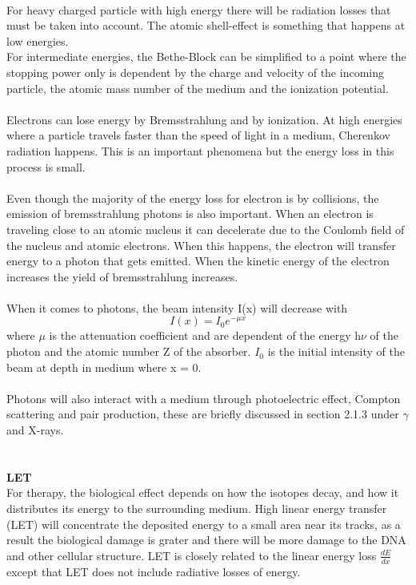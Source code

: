 \documentclass[twoside,english]{uiofysmaster/uiofysmaster}
\begin{document}
\\
For heavy charged particle with high energy there will be radiation losses that must be taken into account. The atomic shell-effect is something that happens at low energies.\cite{nuclearchem}\\
For intermediate energies, the Bethe-Block can be simplified to a point where the stopping power only is dependent by the charge and velocity of the incoming particle, the atomic mass number of the medium and the ionization potential\cite{nuclearchem}.\\
\\
Electrons can lose energy by Bremsstrahlung and by ionization. At high energies where a particle travels faster than the speed of light in a medium, Cherenkov radiation happens. This is an important phenomena but the energy loss in this process is small\cite{nuclearchem}.\\
\\
Even though the majority of the energy loss for electron is by collisions, the emission of bremsstrahlung photons is also important. When an electron is traveling close to an atomic nucleus it can decelerate due to the Coulomb field of the nucleus and atomic electrons. When this happens, the electron will transfer energy to a photon that gets emitted. When the kinetic energy of the electron increases the yield of bremsstrahlung increases.
\\
\\
When it comes to photons, the beam intensity I(x) will decrease with \begin{equation}
    I(x) = I_0e^{-\mu x}
\end{equation}
\noindent
where $\mu$ is the attenuation coefficient and are dependent of the energy h$\nu$ of the photon and the atomic number Z of the absorber\cite{Nuclear_medicine}. $I_0$ is the initial intensity of the beam at depth in medium where x = 0.\\
\\
Photons will also interact with a medium through photoelectric effect, Compton scattering and pair production, these are briefly discussed in section 2.1.3 under $\gamma$ and X-rays.\\
\\
\\
\noindent
\textbf{LET}\\
For therapy, the biological effect depends on how the isotopes decay, and how it distributes its energy to the surrounding medium. High linear energy transfer (LET) will concentrate the deposited energy to a small area near its tracks, as a result the biological damage is grater and there will be more damage to the DNA and other cellular structure. LET is closely related to the linear energy loss $\frac{dE}{dx}$ except that LET does not include radiative losses of energy. \\
\end{document}
